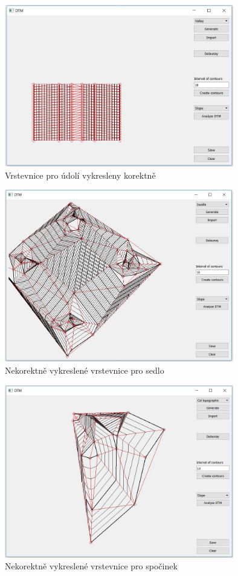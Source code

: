 \documentclass[a4paper, 12pt]{article}
\begin{document}
\begin{figure}[h!]
\centering
\includegraphics[width=10cm]{pictures/valley_ok.jpg}
\caption{Vrstevnice pro údolí vykresleny korektně}
\end{figure}

\begin{figure}[h!]
\centering
\includegraphics[width=10cm]{pictures/saddle_bad.jpg}
\caption{Nekorektně vykreslené vrstevnice pro sedlo}
\end{figure}

\begin{figure}[h!]
\centering
\includegraphics[width=10cm]{pictures/spocinek_nicmoc.jpg}
\caption{Nekorektně vykreslené vrstevnice pro spočinek}
\end{figure}
\end{document}

